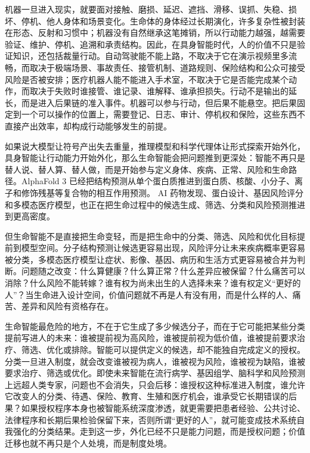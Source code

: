机器一旦进入现实，就要面对接触、磨损、延迟、遮挡、滑移、误抓、失稳、损坏、停机、他人身体和场景变化。生命体的身体经过长期演化，许多复杂性被封装在形态、反射和习惯中；机器没有自然继承这笔摊销，所以行动能力越强，越需要验证、维护、停机、追溯和承责结构。因此，在具身智能时代，人的价值不只是验证知识，还包括裁量行动。自动驾驶能不能上路，不取决于它在演示视频里多流畅，而取决于极端场景、事故责任、接管机制、道路规则、保险结构和公众可接受风险是否被安排；医疗机器人能不能进入手术室，不取决于它是否能完成某个动作，而取决于失败时谁接管、谁记录、谁解释、谁承担损失。行动不是输出的延长，而是进入后果链的准入事件。机器可以参与行动，但后果不能悬空。把后果固定到一个可以操作的位置上，需要登记、日志、审计、停机权和保险，这些东西不直接产出效率，却构成行动能够发生的前提。

如果说大模型让符号产出失去重量，推理模型和科学代理体让形式探索开始外化，具身智能让行动能力开始外化，那么生命智能会把问题推到更深处：智能不再只是替人说、替人算、替人做，而是开始参与定义身体、疾病、正常、风险和生命路径。AlphaFold 3 已经把结构预测从单个蛋白质推进到蛋白质、核酸、小分子、离子和修饰残基等复合物的相互作用预测。\cite{abramson2024alphafold3} AI 药物发现、蛋白设计、基因风险评分和多模态医疗模型，也正在把生命过程中的候选生成、筛选、分类和风险预测推进到更高密度。\cite{fritzsche2023ethical}

但生命智能不是直接把生命变轻，而是把生命中的分类、筛选、风险和优化目标提前到模型空间。分子结构预测让候选更容易出现，风险评分让未来疾病概率更容易被分类，多模态医疗模型让症状、影像、基因、病历和生活方式更容易被合并为判断。问题随之改变：什么算健康？什么算正常？什么差异应被保留？什么痛苦可以消除？什么风险不能转嫁？谁有权为尚未出生的人选择未来？谁有权定义“更好的人”？当生命进入设计空间，价值问题就不再是人有没有用，而是什么样的人、痛苦、差异和风险有资格存在。

生命智能最危险的地方，不在于它生成了多少候选分子，而在于它可能把某些分类提前写进人的未来：谁被提前视为高风险，谁被提前视为低价值，谁被提前要求治疗、筛选、优化或排除。智能可以提供定义的候选，却不能独自完成定义的授权。分类一旦进入制度，就会改变谁被视为病人，谁被视为风险，谁被视为缺陷，谁被要求治疗、筛选或优化。即使未来智能在流行病学、基因组学、脑科学和风险预测上远超人类专家，问题也不会消失，只会后移：谁授权这种标准进入制度，谁允许它改变人的分类、待遇、保险、教育、生殖和医疗机会，谁承受它长期错误的后果？如果授权程序本身也被智能系统深度渗透，就更需要把患者经验、公共讨论、法律程序和长期后果检验保留下来，否则所谓“更好的人”，就可能变成技术系统自我强化的分类结果。走到这一步，外化已经不只是能力问题，而是授权问题；价值迁移也就不再只是个人处境，而是制度处境。

